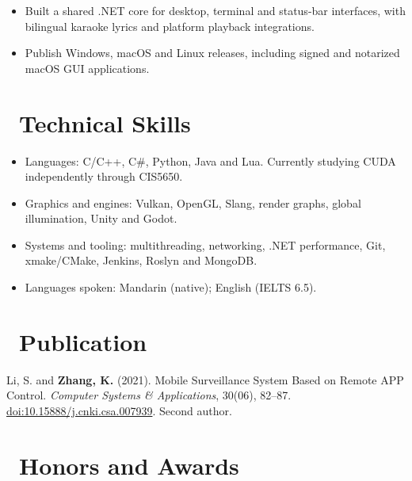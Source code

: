 \documentclass{resume}
\begin{document}
\begin{itemize}
  \item Built a shared .NET core for desktop, terminal and status-bar interfaces, with bilingual karaoke lyrics and platform playback integrations.
  \item Publish Windows, macOS and Linux releases, including signed and notarized macOS GUI applications.
\end{itemize}

\section{\faCogs\ Technical Skills}
\begin{itemize}
  \item Languages: C/C++, C\#, Python, Java and Lua. Currently studying CUDA independently through CIS5650.
  \item Graphics and engines: Vulkan, OpenGL, Slang, render graphs, global illumination, Unity and Godot.
  \item Systems and tooling: multithreading, networking, .NET performance, Git, xmake/CMake, Jenkins, Roslyn and MongoDB.
  \item Languages spoken: Mandarin (native); English (IELTS 6.5).
\end{itemize}

\section{\faBook\ Publication}
Li, S. and \textbf{Zhang, K.} (2021). Mobile Surveillance System Based on Remote APP Control.
\textit{Computer Systems \& Applications}, 30(06), 82--87.
\href{https://doi.org/10.15888/j.cnki.csa.007939}{doi:10.15888/j.cnki.csa.007939}. Second author.

\section{\faHeartO\ Honors and Awards}
\end{document}
